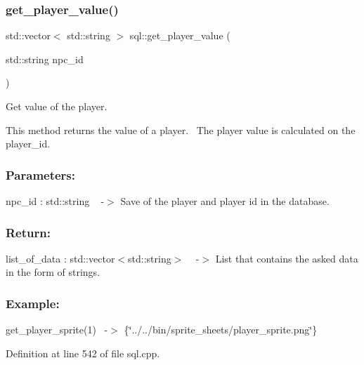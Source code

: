 \subsubsection{\texorpdfstring{get\+\_\+player\+\_\+value()}{get\_player\_value()}\hspace{0.1cm}{\footnotesize\ttfamily [2/2]}}
{\footnotesize\ttfamily std\+::vector$<$ std\+::string $>$ sql\+::get\+\_\+player\+\_\+value (\begin{DoxyParamCaption}\item[{std\+::string}]{npc\+\_\+id }\end{DoxyParamCaption})}



Get value of the player. 

This method returns the value of a player.~\newline
The player value is calculated on the player\+\_\+id.~\newline


\subsubsection*{Parameters\+: }

npc\+\_\+id \+: std\+::string ~\newline
-\/$>$ Save of the player and player id in the database.

\subsubsection*{Return\+: }

list\+\_\+of\+\_\+data \+: std\+::vector$<$std\+::string$>$ ~\newline
-\/$>$ List that contains the asked data in the form of strings.

\subsubsection*{Example\+: }

get\+\_\+player\+\_\+sprite(1)~\newline
-\/$>$ \{\char`\"{}../../bin/sprite\+\_\+sheets/player\+\_\+sprite.\+png\char`\"{}\} 

Definition at line 542 of file sql.\+cpp.

